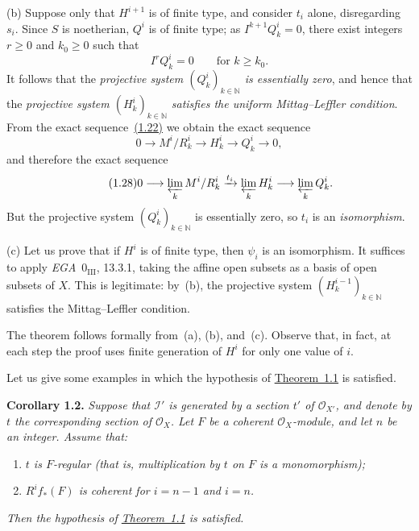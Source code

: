 \noindent\textup{(b)} Suppose only that $H^{i+1}$ is of finite type, and
consider $t_i$ alone, disregarding $s_i$. Since $S$ is noetherian, $Q^i$ is of
finite type; as $I^{k+1}Q_k^i=0$, there exist integers $r\geq0$ and $k_0\geq0$
such that
\begin{equation}
\tag{1.26}\label{eq:IX.1.26}
I^rQ_k^i=0\qquad\text{for }k\geq k_0.
\end{equation}
It follows that the \emph{projective system $(Q_k^i)_{k\in\mathbb N}$ is
essentially zero}, and hence that the \emph{projective system
$(H_k^i)_{k\in\mathbb N}$ satisfies the uniform Mittag--Leffler condition}.
From the exact sequence~\hyperref[eq:IX.1.22]{(1.22)} we obtain the exact sequence
\begin{equation}
\tag{1.27}\label{eq:IX.1.27}
0\longrightarrow M^i/R_k^i\longrightarrow H_k^i
 \longrightarrow Q_k^i\longrightarrow0,
\end{equation}
and therefore the exact sequence
\begin{equation}
\tag{1.28}\label{eq:IX.1.28}
0\longrightarrow\varprojlim_k M^i/R_k^i
 \xrightarrow{t_i}\varprojlim_k H_k^i
 \longrightarrow\varprojlim_k Q_k^i.
\end{equation}
But the projective system $(Q_k^i)_{k\in\mathbb N}$ is essentially zero, so
$t_i$ is an \emph{isomorphism}.

\noindent\textup{(c)} Let us prove that if $H^i$ is of finite type, then
$\psi_i$ is an isomorphism. It suffices to apply \emph{EGA}~$0_{\mathrm{III}}$,
13.3.1, taking the affine open subsets as a basis of open subsets of $X$.
This is legitimate: by~(b), the projective system
$(H_k^{i-1})_{k\in\mathbb N}$ satisfies the Mittag--Leffler condition.

The theorem follows formally from~(a), (b), and~(c). Observe that, in fact, at
each step the proof uses finite generation of $H^i$ for only one value of $i$.

Let us give some examples in which the hypothesis of \hyperref[IX.1.1]{Theorem~1.1} is satisfied.

\medskip
{}\noindent\textbf{Corollary 1.2.}\quad
\emph{Suppose that $\mathcal I'$ is generated by a section $t'$ of
$\mathcal O_{X'}$, and denote by $t$ the corresponding section of
$\mathcal O_X$. Let $F$ be a coherent $\mathcal O_X$-module, and let $n$ be
an integer. Assume that:}
\begin{enumerate}
\item[(i)] \emph{$t$ is $F$-regular (that is, multiplication by $t$ on $F$
is a monomorphism);}
\item[(ii)] \emph{$R^i f_*(F)$ is coherent for $i=n-1$ and $i=n$.}
\end{enumerate}
\emph{Then the hypothesis of \hyperref[IX.1.1]{Theorem~1.1} is satisfied.}

